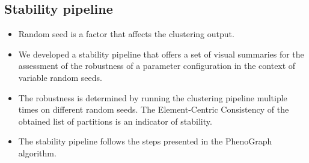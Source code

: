 \subsection{Stability pipeline}

\begin{frame}
    \begin{itemize}
        \item Random seed is a factor that affects the clustering output.
        \item We developed a stability pipeline that offers a set of visual summaries for the assessment of the robustness of a parameter configuration in the context of variable random seeds.
        \item The robustness is determined by running the clustering pipeline multiple times on different random seeds. The Element-Centric Consistency of the obtained list of partitions is an indicator of stability.
        \item The stability pipeline follows the steps presented in the PhenoGraph algorithm.
    \end{itemize}
\end{frame}


